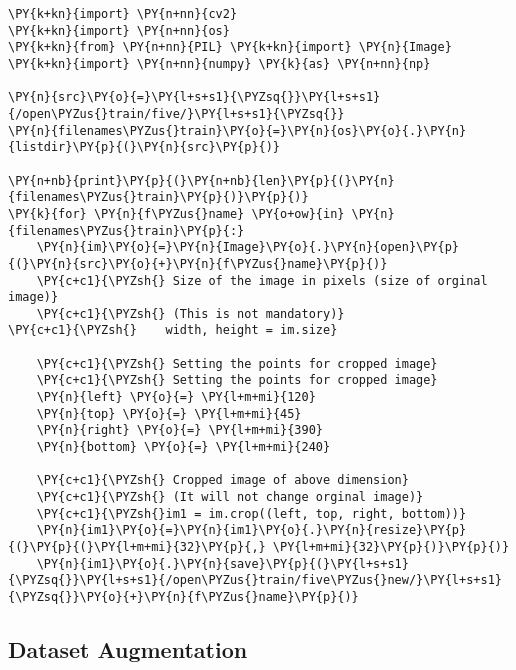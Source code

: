     \begin{tcolorbox}[breakable, size=fbox, boxrule=1pt, pad at break*=1mm,colback=cellbackground, colframe=cellborder]
\begin{Verbatim}[commandchars=\\\{\}]
\PY{k+kn}{import} \PY{n+nn}{cv2}
\PY{k+kn}{import} \PY{n+nn}{os}
\PY{k+kn}{from} \PY{n+nn}{PIL} \PY{k+kn}{import} \PY{n}{Image}
\PY{k+kn}{import} \PY{n+nn}{numpy} \PY{k}{as} \PY{n+nn}{np}
  
\PY{n}{src}\PY{o}{=}\PY{l+s+s1}{\PYZsq{}}\PY{l+s+s1}{/open\PYZus{}train/five/}\PY{l+s+s1}{\PYZsq{}}
\PY{n}{filenames\PYZus{}train}\PY{o}{=}\PY{n}{os}\PY{o}{.}\PY{n}{listdir}\PY{p}{(}\PY{n}{src}\PY{p}{)}

\PY{n+nb}{print}\PY{p}{(}\PY{n+nb}{len}\PY{p}{(}\PY{n}{filenames\PYZus{}train}\PY{p}{)}\PY{p}{)}
\PY{k}{for} \PY{n}{f\PYZus{}name} \PY{o+ow}{in} \PY{n}{filenames\PYZus{}train}\PY{p}{:}
    \PY{n}{im}\PY{o}{=}\PY{n}{Image}\PY{o}{.}\PY{n}{open}\PY{p}{(}\PY{n}{src}\PY{o}{+}\PY{n}{f\PYZus{}name}\PY{p}{)}
    \PY{c+c1}{\PYZsh{} Size of the image in pixels (size of orginal image)}
    \PY{c+c1}{\PYZsh{} (This is not mandatory)}
\PY{c+c1}{\PYZsh{}    width, height = im.size}
  
    \PY{c+c1}{\PYZsh{} Setting the points for cropped image}
    \PY{c+c1}{\PYZsh{} Setting the points for cropped image}
    \PY{n}{left} \PY{o}{=} \PY{l+m+mi}{120}
    \PY{n}{top} \PY{o}{=} \PY{l+m+mi}{45}
    \PY{n}{right} \PY{o}{=} \PY{l+m+mi}{390}
    \PY{n}{bottom} \PY{o}{=} \PY{l+m+mi}{240}
  
    \PY{c+c1}{\PYZsh{} Cropped image of above dimension}
    \PY{c+c1}{\PYZsh{} (It will not change orginal image)}
    \PY{c+c1}{\PYZsh{}im1 = im.crop((left, top, right, bottom))}
    \PY{n}{im1}\PY{o}{=}\PY{n}{im1}\PY{o}{.}\PY{n}{resize}\PY{p}{(}\PY{p}{(}\PY{l+m+mi}{32}\PY{p}{,} \PY{l+m+mi}{32}\PY{p}{)}\PY{p}{)}
    \PY{n}{im1}\PY{o}{.}\PY{n}{save}\PY{p}{(}\PY{l+s+s1}{\PYZsq{}}\PY{l+s+s1}{/open\PYZus{}train/five\PYZus{}new/}\PY{l+s+s1}{\PYZsq{}}\PY{o}{+}\PY{n}{f\PYZus{}name}\PY{p}{)}
\end{Verbatim}
\end{tcolorbox}

\subsection{    Dataset Augmentation}


